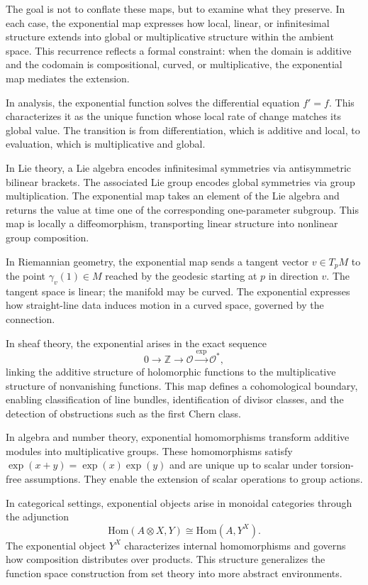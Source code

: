 The goal is not to conflate these maps, but to examine what they preserve. In each case, the exponential map expresses how local, linear, or infinitesimal structure extends into global or multiplicative structure within the ambient space. This recurrence reflects a formal constraint: when the domain is additive and the codomain is compositional, curved, or multiplicative, the exponential map mediates the extension.

In analysis, the exponential function solves the differential equation \( f' = f \). This characterizes it as the unique function whose local rate of change matches its global value. The transition is from differentiation, which is additive and local, to evaluation, which is multiplicative and global.

In Lie theory, a Lie algebra encodes infinitesimal symmetries via antisymmetric bilinear brackets. The associated Lie group encodes global symmetries via group multiplication. The exponential map takes an element of the Lie algebra and returns the value at time one of the corresponding one-parameter subgroup. This map is locally a diffeomorphism, transporting linear structure into nonlinear group composition.

In Riemannian geometry, the exponential map sends a tangent vector \( v \in T_p M \) to the point \( \gamma_v(1) \in M \) reached by the geodesic starting at \( p \) in direction \( v \). The tangent space is linear; the manifold may be curved. The exponential expresses how straight-line data induces motion in a curved space, governed by the connection.

In sheaf theory, the exponential arises in the exact sequence
\[
0 \to \mathbb{Z} \to \mathcal{O} \xrightarrow{\exp} \mathcal{O}^*,
\]
linking the additive structure of holomorphic functions to the multiplicative structure of nonvanishing functions. This map defines a cohomological boundary, enabling classification of line bundles, identification of divisor classes, and the detection of obstructions such as the first Chern class.

In algebra and number theory, exponential homomorphisms transform additive modules into multiplicative groups. These homomorphisms satisfy \( \exp(x + y) = \exp(x)\exp(y) \) and are unique up to scalar under torsion-free assumptions. They enable the extension of scalar operations to group actions.

In categorical settings, exponential objects arise in monoidal categories through the adjunction
\[
\mathrm{Hom}(A \otimes X, Y) \cong \mathrm{Hom}(A, Y^X).
\]
The exponential object \( Y^X \) characterizes internal homomorphisms and governs how composition distributes over products. This structure generalizes the function space construction from set theory into more abstract environments.

